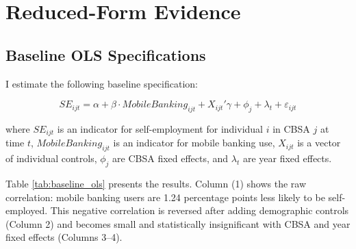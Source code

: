 \documentclass[12pt]{article}
\begin{document}
\section{Reduced-Form Evidence}
\label{sec:reduced_form}

\subsection{Baseline OLS Specifications}

I estimate the following baseline specification:

\begin{equation}
SE_{ijt} = \alpha + \beta \cdot MobileBanking_{ijt} + X_{ijt}'\gamma + \phi_j + \lambda_t + \varepsilon_{ijt}
\label{eq:baseline}
\end{equation}

where $SE_{ijt}$ is an indicator for self-employment for individual $i$ in CBSA $j$ at time $t$, $MobileBanking_{ijt}$ is an indicator for mobile banking use, $X_{ijt}$ is a vector of individual controls, $\phi_j$ are CBSA fixed effects, and $\lambda_t$ are year fixed effects.

Table \ref{tab:baseline_ols} presents the results. Column (1) shows the raw correlation: mobile banking users are 1.24 percentage points less likely to be self-employed. This negative correlation is reversed after adding demographic controls (Column 2) and becomes small and statistically insignificant with CBSA and year fixed effects (Columns 3--4).
\end{document}
